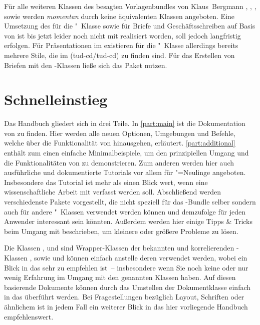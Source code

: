 Für alle weiteren Klassen des besagten Vorlagenbundles von Klaus~Bergmann
, ,
,  sowie
 werden \emph{momentan} durch \TUDScript
keine äquivalenten Klassen angeboten.
%
Eine Umsetzung des \CDs für die "~Klasse sowie für Briefe und 
Geschäftsschreiben auf Basis von \KOMAScript ist bis jetzt leider noch nicht 
mit \TUDScript realisiert worden, soll jedoch langfristig erfolgen. Für 
Präsentationen im \TUDCD existieren für die "~Klasse allerdings 
bereits mehrere Stile, die im \GitHubRepo(tud-cd/tud-cd) zu finden sind. 
Für das Erstellen von Briefen mit den \TUDScript-Klassen ließe sich das Paket 
 nutzen.



\section{Schnelleinstieg}
%
Das Handbuch gliedert sich in drei Teile. In \autoref{part:main} ist die 
Dokumentation von \TUDScript zu finden. Hier werden alle neuen Optionen, 
Umgebungen und Befehle, welche über die Funktionalität von \KOMAScript 
hinausgehen, erläutert. \autoref{part:additional} enthält zum einen einfache 
Minimalbeispiele, um den prinzipiellen Umgang und die Funktionalitäten von 
\TUDScript zu demonstrieren. Zum anderen werden hier auch ausführliche und 
dokumentierte Tutorials vor allem für "=Neulinge angeboten. 
Insbesondere das Tutorial  ist mehr als einen Blick wert, 
wenn eine wissenschaftliche Arbeit mit  verfasst werden soll.
Abschließend werden verschiedenste Pakete vorgestellt, die nicht speziell für 
das \TUDScript-Bundle selber sondern auch für andere "~Klassen
verwendet werden können und demzufolge für jeden Anwender interessant sein 
könnten. Außerdem werden hier einige Tipps \& Tricks beim Umgang mit 
 beschrieben, um kleinere oder größere Probleme zu lösen.

Die Klassen ,  und  
sind Wrapper-Klassen der bekannten und korrelierenden \KOMAScript-Klassen 
,  sowie  und können einfach 
anstelle deren verwendet werden, wobei ein Blick in das \scrguide sehr zu 
empfehlen ist~-- insbesondere wenn Sie noch keine oder nur wenig Erfahrung im 
Umgang mit den genannten Klassen haben. Auf diesen basierende Dokumente können 
durch das Umstellen der Dokumentklasse einfach in das \TUDCD überführt werden. 
Bei Fragestellungen bezüglich Layout, Schriften oder ähnlichem ist in jedem 
Fall ein weiterer Blick in das hier vorliegende Handbuch empfehlenswert.
